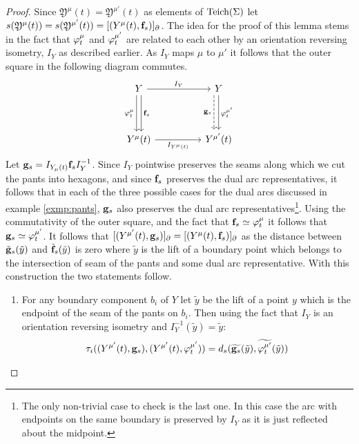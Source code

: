 \begin{proof}
  Since $ \mathfrak{Y}^\mu(t) = \mathfrak{Y}^{\mu'}(t)$ as elements of $\text{Teich}(\Sigma)$ let $s( \mathfrak{Y}^\mu(t)) = s( \mathfrak{Y}^{\mu'}(t))= [(Y^\mu(t), \mathbf{f}_s)]_\partial$. The idea for the proof of this lemma stems in the fact that $\varphi^\mu_t$ and $\varphi^{\mu'}_t$ are related to each other by an orientation reversing isometry, $I_Y$ as described earlier. As $I_{Y}$ maps $\mu$ to $\mu'$ it follows that the outer square in the following diagram commutes.
  \[\begin{tikzcd}
	Y && Y \\
	\\
	{Y^\mu(t)} && {Y^{\mu'}(t)}
	\arrow["{{I_{Y}}}", from=1-1, to=1-3]
	\arrow["{{\varphi^\mu_t}}"', shift right, from=1-1, to=3-1]
	\arrow["{\mathbf{f}_s}", shift left, from=1-1, to=3-1]
	\arrow["{{\varphi_t^{\mu'}}}", from=1-3, to=3-3]
	\arrow["{\mathbf{g}_s}"', shift right=2, dashed, from=1-3, to=3-3]
	\arrow["{{I_{Y^\mu(t)}}}"', from=3-1, to=3-3]
\end{tikzcd}\]
Let $\mathbf{g}_s = I_{Y_\mu(t)}\mathbf{f}_sI_{Y}^{-1}$. Since $I_{Y}$ pointwise preserves the seams along which we cut the pants into hexagons, and since $\mathbf{f}_s$ preserves the dual arc representatives, it follows that in each of the three possible cases for the dual arcs discussed in example \ref{exmp:pants}, $\mathbf{g}_s$ also preserves the dual arc representatives\footnote{The only non-trivial case to check is the last one. In this case the arc with endpoints on the same boundary is preserved by $I_Y$ as it is just reflected about the midpoint.}. Using the commutativity of the outer square, and the fact that $\mathbf{f}_s \simeq \varphi^\mu_t$ it follows that $\mathbf{g}_s \simeq \varphi^{\mu'}_t$. It follows that $[(Y^{\mu'}(t), \mathbf{g}_s)]_\partial = [(Y^\mu(t), \mathbf{f}_s)]_\partial$ as the distance between $\tilde{\mathbf{g}}_s(\tilde{y})$ and $\tilde{\mathbf{f}}_s(\tilde{y})$ is zero where $\tilde{y}$ is the lift of a boundary point which belongs to the intersection of seam of the pants and some dual arc representative. With this construction the two statements follow.
  \begin{enumerate}
    \item For any boundary component $b_i$ of $Y$ let $\tilde{y}$ be the lift of a point $y$ which is the endpoint of the seam of the pants on $b_i$. Then using the fact that $I_Y$ is an orientation reversing isometry and $I_Y^{-1}(\tilde{y}) = \tilde{y}$:
      \begin{align*}
        \tau_i((Y^{\mu'}(t), \gs_s),(Y^{\mu'}(t),\vp^{\mu'}_t)) &= d_s(\widetilde{\gs_s}(\tilde{y}), \widetilde{\vp^{\mu'}_t}(\tilde{y}))\\

\end{align*}
\end{enumerate}
\end{proof}
